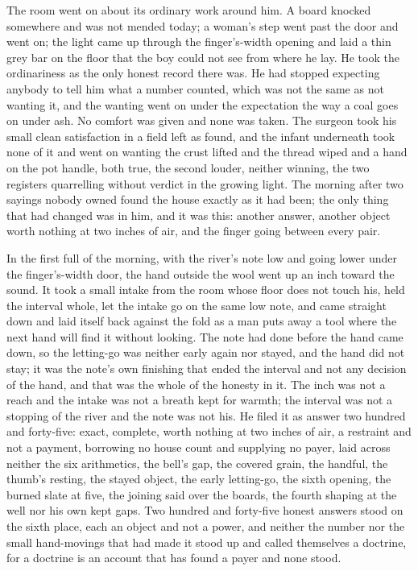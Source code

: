 The room went on about its ordinary work around him. A board knocked somewhere and was not mended today; a woman's step went past the door and went on; the light came up through the finger's-width opening and laid a thin grey bar on the floor that the boy could not see from where he lay. He took the ordinariness as the only honest record there was. He had stopped expecting anybody to tell him what a number counted, which was not the same as not wanting it, and the wanting went on under the expectation the way a coal goes on under ash. No comfort was given and none was taken. The surgeon took his small clean satisfaction in a field left as found, and the infant underneath took none of it and went on wanting the crust lifted and the thread wiped and a hand on the pot handle, both true, the second louder, neither winning, the two registers quarrelling without verdict in the growing light. The morning after two sayings nobody owned found the house exactly as it had been; the only thing that had changed was in him, and it was this: another answer, another object worth nothing at two inches of air, and the finger going between every pair.

In the first full of the morning, with the river's note low and going lower under the finger's-width door, the hand outside the wool went up an inch toward the sound. It took a small intake from the room whose floor does not touch his, held the interval whole, let the intake go on the same low note, and came straight down and laid itself back against the fold as a man puts away a tool where the next hand will find it without looking. The note had done before the hand came down, so the letting-go was neither early again nor stayed, and the hand did not stay; it was the note's own finishing that ended the interval and not any decision of the hand, and that was the whole of the honesty in it. The inch was not a reach and the intake was not a breath kept for warmth; the interval was not a stopping of the river and the note was not his. He filed it as answer two hundred and forty-five: exact, complete, worth nothing at two inches of air, a restraint and not a payment, borrowing no house count and supplying no payer, laid across neither the six arithmetics, the bell's gap, the covered grain, the handful, the thumb's resting, the stayed object, the early letting-go, the sixth opening, the burned slate at five, the joining said over the boards, the fourth shaping at the well nor his own kept gaps. Two hundred and forty-five honest answers stood on the sixth place, each an object and not a power, and neither the number nor the small hand-movings that had made it stood up and called themselves a doctrine, for a doctrine is an account that has found a payer and none stood.

